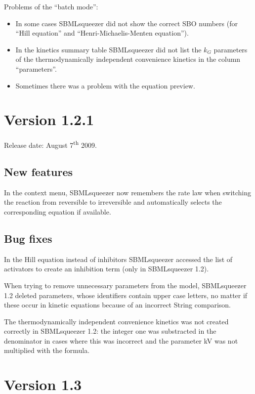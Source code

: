 Problems of the ``batch mode'':
\begin{itemize}
\item In some cases SBMLsqueezer did not show the correct SBO numbers (for 
      ``Hill equation'' and ``Henri-Michaelis-Menten equation'').
\item In the kinetics summary table SBMLsqueezer did not list the $k_G$
      parameters of the thermodynamically independent convenience kinetics in
      the column ``parameters''.
\item Sometimes there was a problem with the equation preview.
\end{itemize}


\section{Version 1.2.1}

Release date: August 7\textsuperscript{th} 2009.

\subsection{New features}

In the context menu, SBMLsqueezer now remembers the rate law when switching the
reaction from reversible to irreversible and automatically selects the
corresponding equation if available.

\subsection{Bug fixes}

In the Hill equation instead of inhibitors SBMLsqueezer accessed the list of
activators to create an inhibition term (only in SBMLsqueezer 1.2).

When trying to remove unnecessary parameters from the model, SBMLsqueezer 1.2
deleted parameters, whose identifiers contain upper case letters, no matter if
these occur in kinetic equations because of an incorrect String comparison.

The thermodynamically independent convenience kinetics was not created correctly
in SBMLsqueezer 1.2: the integer one was substracted in the denominator in cases
where this was incorrect and the parameter kV was not multiplied with the
formula.



\section{Version 1.3}

